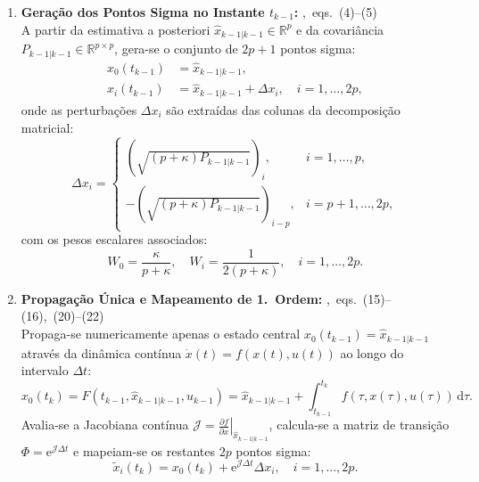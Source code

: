 \documentclass{article}
\newcommand{\stepref}[1]{\hfill\mbox{\footnotesize\normalfont\textsf{\cite{biswas2017}, #1}}}
\begin{document}
\begin{algorithmbox}
\begin{enumerate}[leftmargin=*, itemsep=6pt]
    \item \textbf{Gera\c{c}\~ao dos Pontos Sigma no Instante $t_{k-1}$:} \stepref{eqs.~(4)--(5)} \\
    A partir da estimativa a posteriori $\hat{x}_{k-1|k-1} \in \mathbb{R}^p$ e da covari\^ancia $P_{k-1|k-1} \in \mathbb{R}^{p \times p}$, gera-se o conjunto de $2p+1$ pontos sigma:
    \begin{align}
        x_0(t_{k-1}) &= \hat{x}_{k-1|k-1}, \\
        x_i(t_{k-1}) &= \hat{x}_{k-1|k-1} + \Delta x_i, \quad i = 1, \dots, 2p,
    \end{align}
    onde as perturba\c{c}\~oes $\Delta x_i$ s\~ao extra\'idas das colunas da decomposi\c{c}\~ao matricial:
    \begin{equation}
        \Delta x_i = 
        \begin{cases} 
            \left(\sqrt{(p+\kappa)P_{k-1|k-1}}\right)_i, & i = 1, \dots, p, \\ 
            -\left(\sqrt{(p+\kappa)P_{k-1|k-1}}\right)_{i-p}, & i = p+1, \dots, 2p,
        \end{cases}
    \end{equation}
    com os pesos escalares associados:
    \begin{equation}
        W_0 = \frac{\kappa}{p+\kappa}, \quad 
        W_i = \frac{1}{2(p+\kappa)}, \quad i = 1, \dots, 2p.
    \end{equation}

    \item \textbf{Propaga\c{c}\~ao \'Unica e Mapeamento de 1.\textordfeminine\ Ordem:} \stepref{eqs.~(15)--(16), (20)--(22)} \\
    Propaga-se numericamente apenas o estado central $x_0(t_{k-1}) = \hat{x}_{k-1|k-1}$ atrav\'es da din\^amica cont\'inua $\dot{x}(t) = f(x(t), u(t))$ ao longo do intervalo $\Delta t$:
    \begin{equation}
        x_0(t_k) = F\left(t_{k-1}, \hat{x}_{k-1|k-1}, u_{k-1}\right) = \hat{x}_{k-1|k-1} + \int_{t_{k-1}}^{t_k} f(\tau, x(\tau), u(\tau)) \, \mathrm{d}\tau.
    \end{equation}
    Avalia-se a Jacobiana cont\'inua $\mathcal{J} = \left. \frac{\partial f}{\partial x} \right|_{\hat{x}_{k-1|k-1}}$, calcula-se a matriz de transi\c{c}\~ao $\Phi = \mathrm{e}^{\mathcal{J}\Delta t}$ e mapeiam-se os restantes $2p$ pontos sigma:
    \begin{equation}
        \tilde{x}_i(t_k) = x_0(t_k) + \mathrm{e}^{\mathcal{J}\Delta t} \Delta x_i, \quad i = 1, \dots, 2p.
    \end{equation}


\end{enumerate}
\end{algorithmbox}
\end{document}
